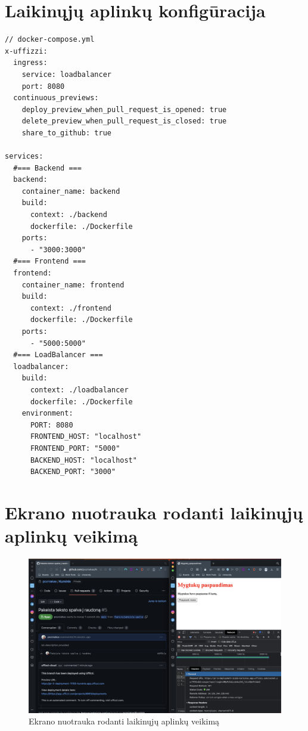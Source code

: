 \documentclass{VUMIFPSkursinis}
\begin{document}
\section{Laikinųjų aplinkų konfigūracija}
\label{priedas5}
\begin{verbatim}
// docker-compose.yml
x-uffizzi:
  ingress:
    service: loadbalancer
    port: 8080
  continuous_previews:
    deploy_preview_when_pull_request_is_opened: true
    delete_preview_when_pull_request_is_closed: true
    share_to_github: true

services:
  #=== Backend ===
  backend:
    container_name: backend
    build:
      context: ./backend
      dockerfile: ./Dockerfile
    ports:
      - "3000:3000"
  #=== Frontend ===
  frontend:
    container_name: frontend
    build:
      context: ./frontend
      dockerfile: ./Dockerfile
    ports:
      - "5000:5000"
  #=== LoadBalancer ===
  loadbalancer:
    build:
      context: ./loadbalancer
      dockerfile: ./Dockerfile
    environment:
      PORT: 8080
      FRONTEND_HOST: "localhost"
      FRONTEND_PORT: "5000"
      BACKEND_HOST: "localhost"
      BACKEND_PORT: "3000"
\end{verbatim}

\section{Ekrano nuotrauka rodanti laikinųjų aplinkų veikimą}
\label{priedas6}
\begin{figure}[H]
    \centering
    \includegraphics[scale=0.3]{img/Final.png}
    \caption{Ekrano nuotrauka rodanti laikinųjų aplinkų veikimą}
    \label{img:mlp}
\end{figure}
\end{document}
